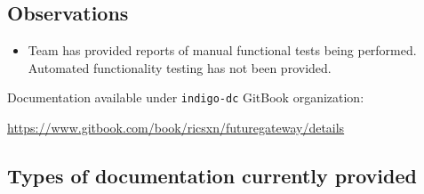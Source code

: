 \documentclass[a4wide,11pt]{article}
\begin{document}
\subsection{Observations}
\begin{itemize}
        \item Team has provided reports of manual functional tests being performed. Automated functionality testing has not been provided.
    \end{itemize}



\label{sec:gitbook}
Documentation available under \texttt{indigo-dc} GitBook organization: \vspace{0.1em} \begin{center}\url{https://www.gitbook.com/book/ricsxn/futuregateway/details}\end{center} 
\subsection{Types of documentation currently provided}
\begin{center}
\end{center}
\end{document}
